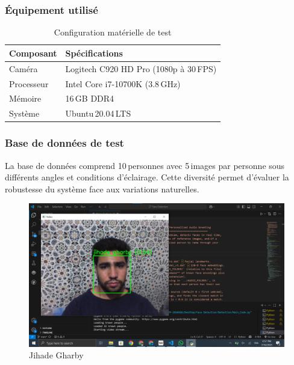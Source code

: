 \documentclass[12pt,a4paper]{article}
\begin{document}
\subsubsection{Équipement utilisé}
\begin{table}[H]
  \centering
  \begin{tabular}{@{}ll@{}}
    \toprule
    \textbf{Composant} & \textbf{Spécifications} \\
    \midrule
    Caméra     & Logitech C920 HD Pro (1080p à 30 FPS) \\
    Processeur & Intel Core i7-10700K (3.8 GHz) \\
    Mémoire    & 16 GB DDR4 \\
    Système    & Ubuntu 20.04 LTS \\
    \bottomrule
  \end{tabular}
  \caption{Configuration matérielle de test}
  \label{tab:hardware}
\end{table}

\subsubsection{Base de données de test}
La base de données comprend 10 personnes avec 5 images par personne sous différents angles et conditions d'éclairage. Cette diversité permet d'évaluer la robustesse du système face aux variations naturelles.

\begin{figure}[H]
  \centering
  \includegraphics[width=\textwidth]{Jihade_GHARBY.png}
  \caption{Jihade Gharby}
  \label{fig:jihade}
\end{figure}
\end{document}
